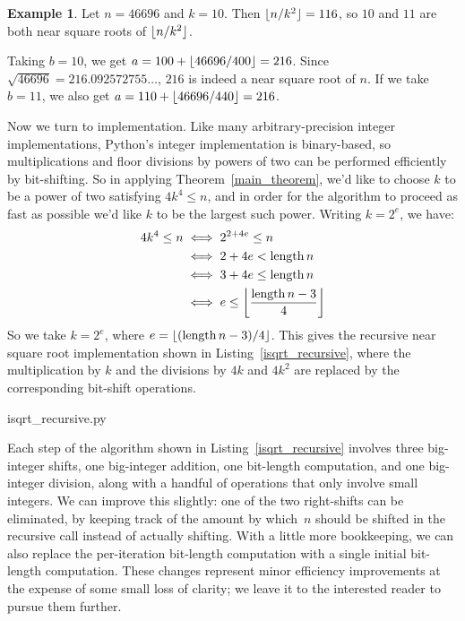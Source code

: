 \documentclass[a4paper]{article}
\DeclarePairedDelimiter\floor{\lfloor}{\rfloor}
\DeclareMathOperator{\length}{length}
\theoremstyle{plain}
\theoremstyle{definition}
\newtheorem{example}[theorem]{Example}
\begin{document}
\begin{example}
  Let $n = 46696$ and $k=10$. Then $\floor{n / k^2} = 116$, so $10$ and
  $11$ are both near square roots of $\floor{n / k^2}$.

  Taking $b = 10$, we get $a = 100 + \floor{46696 / 400} = 216$. Since
  $\sqrt{46696} = 216.092572755\dots$, $216$ is indeed a near square root of
  $n$. If we take $b = 11$, we also get $a = 110 + \floor{46696 / 440} = 216$.
\end{example}

Now we turn to implementation. Like many arbitrary-precision integer
implementations, Python's integer implementation is binary-based, so
multiplications and floor divisions by powers of two can be performed
efficiently by bit-shifting. So in applying Theorem~\ref{main_theorem}, we'd
like to choose $k$ to be a power of two satisfying $4k^4 \le n$, and in order
for the algorithm to proceed as fast as possible we'd like $k$ to be the
largest such power. Writing $k=2^e$, we have:
\begin{align*}
  4k^4 \le n
  &\iff 2^{2 + 4e} \le n \\
  &\iff 2 + 4e < \length n \\
  &\iff 3 + 4e \le \length n \\
  &\iff e \le \floor*{\frac{\length n - 3}{4}}
\end{align*}
So we take $k = 2^e$, where $e={\floor{(\length n - 3)/4}}$. This gives the
recursive near square root implementation shown in
Listing~\ref{isqrt_recursive}, where the multiplication by $k$ and the
divisions by $4k$ and $4k^2$ are replaced by the corresponding bit-shift
operations.


  {isqrt_recursive.py}

Each step of the algorithm shown in Listing~\ref{isqrt_recursive} involves
three big-integer shifts, one big-integer addition, one bit-length computation,
and one big-integer division, along with a handful of operations that only
involve small integers. We can improve this slightly: one of the two
right-shifts can be eliminated, by keeping track of the amount by which~$n$
should be shifted in the recursive call instead of actually shifting. With a
little more bookkeeping, we can also replace the per-iteration bit-length
computation with a single initial bit-length computation. These changes
represent minor efficiency improvements at the expense of some small loss of
clarity; we leave it to the interested reader to pursue them further.
\end{document}
